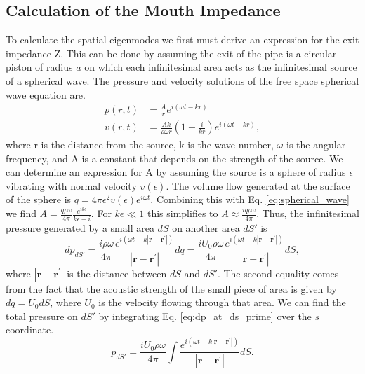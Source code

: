 \documentclass[12pt, letter]{report}
\begin{document}
\subsection{Calculation of the Mouth Impedance}
To calculate the spatial eigenmodes we first must derive an expression for the exit impedance Z. This can be done by assuming the exit of the pipe is a circular piston of radius $a$ on which each infinitesimal area acts as the infinitesimal source of a spherical wave. The pressure and velocity solutions of the free space spherical wave equation are.
\begin{equation}
\label{eq:spherical_wave}
\begin{split}
p(r,t) &= \frac{A}{r} e^{i(\omega t-kr)} \\ v(r,t) &= \frac{Ak}{\rho \omega r} \left( 1 - \frac{i}{kr} \right)e^{i(\omega t-kr)},
\end{split}
\end{equation}
where r is the distance from the source, k is the wave number, $\omega$ is the angular frequency, and A is a constant that depends on the strength of the source. We can determine an expression for A by assuming the source is a sphere of radius $\epsilon$ vibrating with normal velocity $v(\epsilon)$. The volume flow generated at the surface of the sphere is $q = 4 \pi \epsilon^2 v(\epsilon) e^{i \omega t}$. Combining this with Eq. \ref{eq:spherical_wave} we find $A=\frac{q \rho \omega}{4 \pi} \frac{e^{ik\epsilon}}{k\epsilon-i}$. For $k\epsilon \ll 1$ this simplifies to $A \approx \frac{i q \rho \omega}{4 \pi}$. Thus, the infinitesimal pressure generated by a small area $dS$ on another area $dS'$ is
\begin{equation}
\label{eq:dp_at_ds_prime}
dp_{dS'} = \frac{i \rho \omega}{4 \pi} \frac{e^{i(\omega t-k|\textbf{r}-\textbf{r}^\prime|)}}{|\textbf{r}-\textbf{r}^\prime|} dq = \frac{i U_0 \rho \omega}{4 \pi} \frac{e^{i(\omega t-k|\textbf{r}-\textbf{r}^\prime|)}}{|\textbf{r}-\textbf{r}^\prime|} dS,
\end{equation}  
where $|\textbf{r}-\textbf{r}^\prime|$ is the distance between $dS$ and $dS'$. The second equality comes from the fact that the acoustic strength of the small piece of area is given by $dq = U_0 dS$, where $U_0$ is the velocity flowing through that area. We can find the total pressure on $dS'$ by integrating Eq. \ref{eq:dp_at_ds_prime} over the $s$ coordinate.
\begin{equation}
\label{eq:p_at_ds_prime}
p_{dS'} = \frac{i U_0 \rho \omega}{4 \pi} \int \frac{e^{i(\omega t-k|\textbf{r}-\textbf{r}^\prime|)}}{|\textbf{r}-\textbf{r}^\prime|} dS.
\end{equation}
\end{document}
